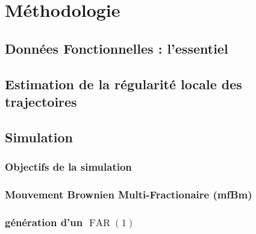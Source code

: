 \chapter{Méthodologie}
\minitoc%

\section{Données Fonctionnelles : l'essentiel}



\section{Estimation de la régularité locale des trajectoires}




\section{Simulation}

\subsection{Objectifs de la simulation}



\subsection{Mouvement Brownien Multi-Fractionaire (mfBm)}



% 

\subsection{génération d'un $\operatorname{FAR}(1)$}



